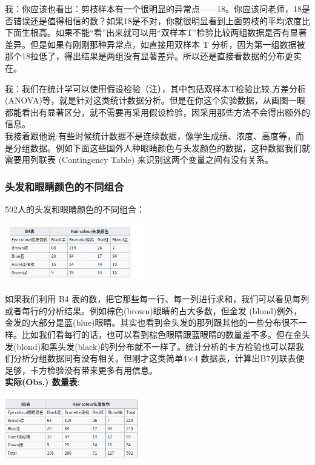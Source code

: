 我：你应该也看出：剪枝样本有一个很明显的异常点------18。你应该问老师，18是否错误还是值得相信的数？如果18是不对，你就很明显看到上面剪枝的平均浓度比下面生根高。如果不能``看''出来就可以用``双样本T''检验比较两组数据是否有显著差异。但是如果有刚刚那种异常点，如直接用双样本
T
分析，因为第一组数据被那个18拉低了，得出结果是两组没有显著差异。所以还是直接看数据的分布更实在。

我：我们在统计学可以使用假设检验（注），其中包括双样本T检验比较,方差分析(ANOVA)等，就是针对这类统计数据分析。但是在你这个实验数据，从画图一眼都能看出有显著区分，就不需要再采用假设检验，因采用那些方法不会得出额外的信息。\\
我接着跟他说:有些时候统计数据不是连续数据，像学生成绩、浓度、高度等，而是分组数据。例如下面这些国外人种眼睛颜色与头发颜色的数据，这种数据我们就需要用列联表
(Contingency Table) 来识别这两个变量之间有没有关系。\\

\hypertarget{ux5934ux53d1ux548cux773cux775bux989cux8272ux7684ux4e0dux540cux7ec4ux5408}{%
\subsubsection{头发和眼睛颜色的不同组合}\label{ux5934ux53d1ux548cux773cux775bux989cux8272ux7684ux4e0dux540cux7ec4ux5408}}

592人的头发和眼睛颜色的不同组合：

\includegraphics[width=6cm]{Screenshotfrom2023-11-0920-19-09.png}

如果我们利用 B4
表的数，把它那些每一行、每一列进行求和，我们可以看见每列或者每行的分析结果。例如棕色(brown)眼睛的占大多数，但金发
(blond)例外，金发的大部分是蓝(blue)眼睛。其实也看到金头发的那列跟其他的一些分布很不一样。比如我们看每行的话，也可以看到棕色眼睛跟蓝眼睛的数量差不多。但在金头发(blond)和黑头发(black)的列分布就不一样了。统计分析的卡方检验也可以帮我们分析分组数据间有没有相关。但刚才这类简单4×4
数据表，计算出B7列联表便足够，卡方检验没有带来更多有用信息。\\
\textbf{实际(Obs.) 数量表}:

\includegraphics[width=6cm]{Screenshotfrom2023-11-0920-20-47.png}

